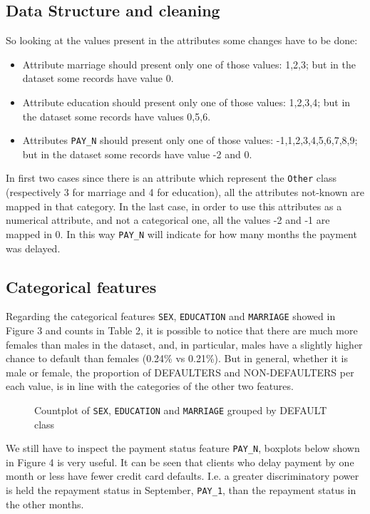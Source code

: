 \documentclass{article}
\begin{document}
\subsection{Data Structure and cleaning} %

So looking at the values present in the attributes some changes have to be done:
\begin{itemize}
    \item Attribute marriage should present only one of those values: 1,2,3; but in the dataset some records have value 0.
    \item Attribute education should present only one of those values: 1,2,3,4; but in the dataset some records have values 0,5,6.
    \item Attributes \texttt{PAY\_N} should present only one of those values: -1,1,2,3,4,5,6,7,8,9; but in the dataset some records have value -2 and 0.
\end{itemize}

In first two cases since there is an attribute which represent the \texttt{Other} class (respectively 3 for marriage and 4 for education), all the attributes not-known are mapped in that category. \newline
In the last case, in order to use this attributes as a numerical attribute, and not a categorical one, all the values -2 and -1 are mapped in 0. In this way \texttt{PAY\_N} will indicate for how many months the payment was delayed.


\subsection{Categorical features}
Regarding the categorical features \texttt{SEX}, \texttt{EDUCATION} and \texttt{MARRIAGE} showed in Figure 3 and counts in Table 2, it is possible to notice that there are much more females than males in the dataset, and, in particular, males have a slightly higher chance to default than females (0.24\% vs 0.21\%). But in general, whether it is male or female, the proportion of DEFAULTERS and NON-DEFAULTERS per each value, is in line with the categories of the other two features.

\begin{figure}[H]
\centering

\caption{Countplot of \texttt{SEX}, \texttt{EDUCATION} and \texttt{MARRIAGE} grouped by DEFAULT class}
\end{figure}


We still have to inspect the payment status feature \texttt{PAY\_N}, boxplots below shown in Figure 4 is very useful. It can be seen that clients who delay payment by one month or less have fewer credit card defaults. I.e.  a greater discriminatory power is held the repayment status in September, \texttt{PAY\_1}, than the repayment status in the other months.
\end{document}
